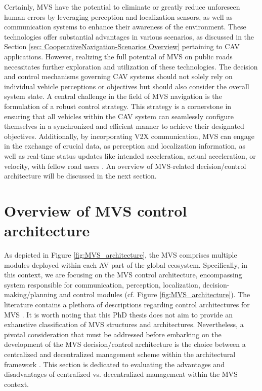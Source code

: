 Certainly, MVS have the potential to eliminate or greatly reduce unforeseen human errors by leveraging perception and localization sensors, as well as communication systems to enhance their awareness of the environment. These technologies offer substantial advantages in various scenarios, as discussed in the Section \ref{sec: CooperativeNavigation-Scenarios Overview} pertaining to CAV applications. However, realizing the full potential of MVS on public roads necessitates further exploration and utilization of these technologies. The decision and control mechanisms governing CAV systems should not solely rely on individual vehicle perceptions or objectives but should also consider the overall system state. A central challenge in the field of MVS navigation is the formulation of a robust control strategy. This strategy is a cornerstone in ensuring that all vehicles within the CAV system can seamlessly configure themselves in a synchronized and efficient manner to achieve their designated objectives. Additionally, by incorporating V2X communication, MVS can engage in the exchange of crucial data, as perception and localization information, as well as real-time status updates like intended acceleration, actual acceleration, or velocity, with fellow road users \cite{guanetti2018control}. An overview of MVS-related decision/control architecture will be discussed in the next section. 




\section{Overview of MVS control architecture} \label{sec:MVS_control_Architecture}
As depicted in Figure \ref{fig:MVS_architecture}, the MVS comprises multiple modules deployed within each AV part of the global ecosystem. Specifically, in this context, we are focusing on the MVS control architecture, encompassing system responsible for communication, perception, localization, decision-making/planning and control modules (cf. Figure \ref{fig:MVS_architecture}). The literature contains a plethora of descriptions regarding control architectures for MVS \cite{adouane2017toward}\cite{hichri2014cooperative}\cite{lozenguez2011map}\cite{vilca2016adaptive}\cite{assaad2018system}\cite{assaad2018cooperative}\cite{assaad2019autonomous}\cite{wang2019survey}.
It is worth noting that this PhD thesis does not aim to provide an exhaustive classification of MVS structures and architectures. Nevertheless, a pivotal consideration that must be addressed before embarking on the development of the MVS decision/control architecture is the choice between a centralized and decentralized management scheme within the architectural framework \cite{7562449} \cite{rios2016automated}\cite{adouane2016autonomous}. This section is dedicated to evaluating the advantages and disadvantages of centralized vs. decentralized management within the MVS context. 


